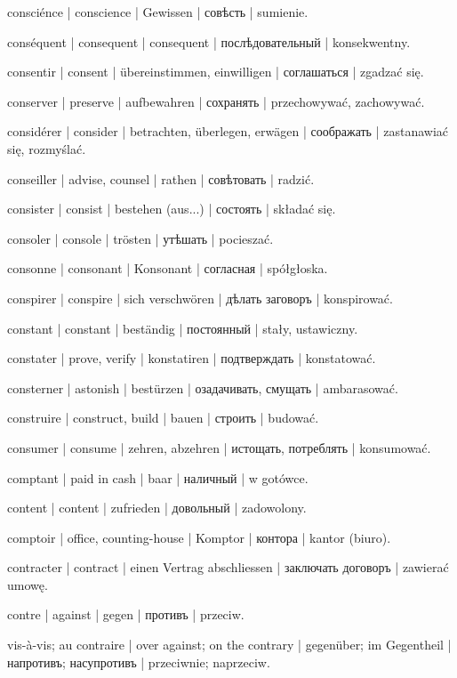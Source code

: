 \begin{outdent}{1em}
consciénce | conscience | Gewissen | совѣсть | sumienie.

conséquent | consequent | consequent | послѣдовательный | konsekwentny.

consentir | consent | übereinstimmen, einwilligen | соглашаться | zgadzać się.

conserver | preserve | aufbewahren | сохранять | przechowywać, zachowywać.

considérer | consider | betrachten, überlegen, erwägen | соображать | zastanawiać się, rozmyślać.

conseiller | advise, counsel | rathen | совѣтовать | radzić.

consister | consist | bestehen (aus...) | состоять | składać się.

consoler | console | trösten | утѣшать | pocieszać.

consonne | consonant | Konsonant | согласная | spółgłoska.

conspirer | conspire | sich verschwören | дѣлать заговоръ | konspirować.

constant | constant | beständig | постоянный | stały, ustawiczny.

constater | prove, verify | konstatiren | подтверждать | konstatować.

consterner | astonish | bestürzen | озадачивать, смущать | ambarasować.

construire | construct, build | bauen | строить | budować.

consumer | consume | zehren, abzehren | истощать, потреблять | konsumować.

comptant | paid in cash | baar | наличный | w gotówce.

content | content | zufrieden | довольный | zadowolony.

comptoir | office, counting-house | Komptor | контора | kantor (biuro).

contracter | contract | einen Vertrag abschliessen | заключать договоръ | zawierać umowę.

contre | against | gegen | противъ | przeciw.

\uvsubentry{}
vis-à-vis; au contraire | over against; on the contrary | gegenüber; im Gegentheil | напротивъ; насупротивъ | przeciwnie; naprzeciw.


\end{outdent}
